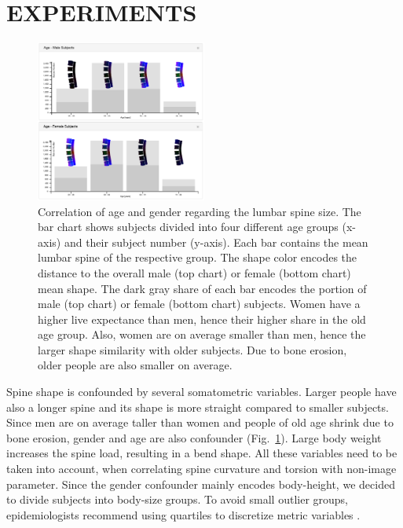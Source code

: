 \documentclass[a4paper,twoside]{style/article}
\begin{document}
\section{\uppercase{Experiments}}
\label{sec:Experiments}
\begin{figure}[!h]
  \centering
  \includegraphics[width=0.5\textwidth]{figures/age-gender}
  \caption{
	Correlation of age and gender regarding the lumbar spine size.
	The bar chart shows subjects divided into four different age groups (x-axis) and their subject number (y-axis).
	Each bar contains the mean lumbar spine of the respective group.
	The shape color encodes the distance to the overall male (top chart) or female (bottom chart) mean shape.
	The dark gray share of each bar encodes the portion of male (top chart) or female (bottom chart) subjects.
	Women have a higher live expectance than men, hence their higher share in the old age group.
	Also, women are on average smaller than men, hence the larger shape similarity with older subjects.
	Due to bone erosion, older people are also smaller on average.
	}
  \label{fig:age-gender}
\end{figure}
\noindent Spine shape is confounded by several somatometric variables.
Larger people have also a longer spine and its shape is more straight compared to smaller subjects.
Since men are on average taller than women and people of old age shrink due to bone erosion, gender and age are also confounder (Fig.~\ref{fig:age-gender}).
Large body weight increases the spine load, resulting in a bend shape.
All these variables need to be taken into account, when correlating spine curvature and torsion with non-image parameter.
Since the gender confounder mainly encodes body-height, we decided to divide subjects into body-size groups.
To avoid small outlier groups, epidemiologists recommend using quartiles to discretize metric variables \cite{Klemm2014VIS}.
\end{document}
